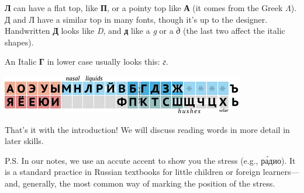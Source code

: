 \textbf{Л} can have a flat top, like \textbf{П}, or a pointy top like
\textbf{А} (it comes from the Greek $ \Lambda$). Д and Л have a similar top in
many fonts, though it's up to the designer. Handwritten \textbf{Д} looks
like \emph{D}, and \textbf{д} like a \emph{g} or a \emph{д} (the last
two affect the italic shapes).

An Italic \textbf{Г} in lower case usually looks this: \emph{г}.

\includegraphics{img/9BB1fM4.png}

That's it with the introduction! We will discuss reading words in more
detail in later skills.

P.S. In our notes, we use an accute accent to show you the stress (e.g.,
р\'{а}дио). It is a standard practice in Russian textbooks for little
children or foreign learners---and, generally, the most common way of
marking the position of the stress.
